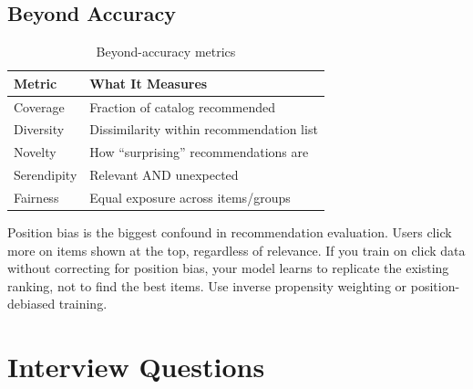 \subsection{Beyond Accuracy}

\begin{table}[H]
\centering
\caption{Beyond-accuracy metrics}
\begin{tabularx}{\textwidth}{lX}
\toprule
\textbf{Metric} & \textbf{What It Measures} \\
\midrule
Coverage & Fraction of catalog recommended \\
Diversity & Dissimilarity within recommendation list \\
Novelty & How ``surprising'' recommendations are \\
Serendipity & Relevant AND unexpected \\
Fairness & Equal exposure across items/groups \\
\bottomrule
\end{tabularx}
\end{table}

\begin{warningbox}
Position bias is the biggest confound in recommendation evaluation. Users click more on items shown at the top, regardless of relevance. If you train on click data without correcting for position bias, your model learns to replicate the existing ranking, not to find the best items. Use inverse propensity weighting or position-debiased training.
\end{warningbox}

\section{Interview Questions}
\label{sr:sec:recsys_interview}


